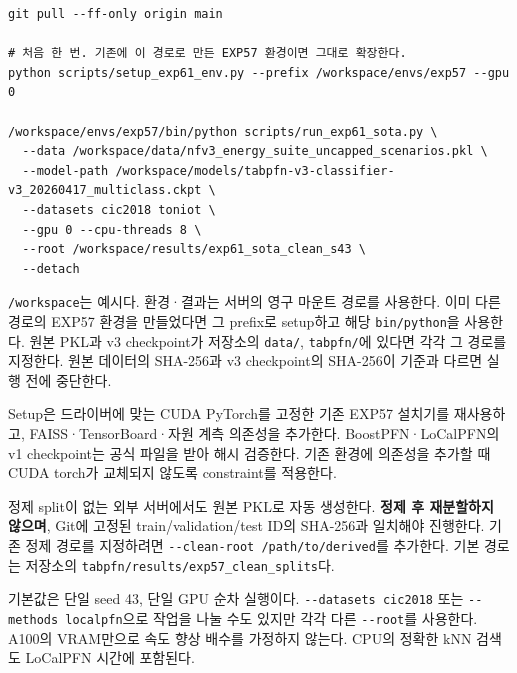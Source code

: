 \begin{Verbatim}[breaklines=true,breakanywhere=true,fontsize=\scriptsize]
git pull --ff-only origin main

# 처음 한 번. 기존에 이 경로로 만든 EXP57 환경이면 그대로 확장한다.
python scripts/setup_exp61_env.py --prefix /workspace/envs/exp57 --gpu 0

/workspace/envs/exp57/bin/python scripts/run_exp61_sota.py \
  --data /workspace/data/nfv3_energy_suite_uncapped_scenarios.pkl \
  --model-path /workspace/models/tabpfn-v3-classifier-v3_20260417_multiclass.ckpt \
  --datasets cic2018 toniot \
  --gpu 0 --cpu-threads 8 \
  --root /workspace/results/exp61_sota_clean_s43 \
  --detach

\end{Verbatim}
\texttt{/\allowbreak{}\allowbreak{}workspa\allowbreak{}ce}는 예시다. 환경·결과는 서버의 영구 마운트 경로를 사용한다. 이미 다른 경로의 EXP57 환경을 만들었다면 그 prefix로 setup하고 해당 \texttt{bin/\allowbreak{}\allowbreak{}pyth\allowbreak{}on}을 사용한다. 원본 PKL과 v3 checkpoint가 저장소의 \texttt{data/\allowbreak{}\allowbreak{}}, \texttt{tabpfn/\allowbreak{}\allowbreak{}}에 있다면 각각 그 경로를 지정한다. 원본 데이터의 SHA-256과 v3 checkpoint의 SHA-256이 기준과 다르면 실행 전에 중단한다.

Setup은 드라이버에 맞는 CUDA PyTorch를 고정한 기존 EXP57 설치기를 재사용하고, FAISS·TensorBoard·자원 계측 의존성을 추가한다. BoostPFN·LoCalPFN의 v1 checkpoint는 공식 파일을 받아 해시 검증한다. 기존 환경에 의존성을 추가할 때 CUDA torch가 교체되지 않도록 constraint를 적용한다.

정제 split이 없는 외부 서버에서도 원본 PKL로 자동 생성한다. \textbf{정제 후 재분할하지 않으며}, Git에 고정된 train/\allowbreak{}validation/\allowbreak{}test ID의 SHA-256과 일치해야 진행한다. 기존 정제 경로를 지정하려면 \texttt{-\allowbreak{}-\allowbreak{}clean-\allowbreak{}root /\allowbreak{}\allowbreak{}pa\allowbreak{}th/\allowbreak{}\allowbreak{}to/\allowbreak{}\allowbreak{}de\allowbreak{}rived}를 추가한다. 기본 경로는 저장소의 \texttt{tabpfn/\allowbreak{}\allowbreak{}r\allowbreak{}esults/\allowbreak{}\allowbreak{}e\allowbreak{}xp57\_\allowbreak{}\allowbreak{}cle\allowbreak{}an\_\allowbreak{}\allowbreak{}split\allowbreak{}s}다.

기본값은 단일 seed 43, 단일 GPU 순차 실행이다. \texttt{-\allowbreak{}-\allowbreak{}datase\allowbreak{}ts cic20\allowbreak{}18} 또는 \texttt{-\allowbreak{}-\allowbreak{}method\allowbreak{}s localp\allowbreak{}fn}으로 작업을 나눌 수도 있지만 각각 다른 \texttt{-\allowbreak{}-\allowbreak{}root}를 사용한다. A100의 VRAM만으로 속도 향상 배수를 가정하지 않는다. CPU의 정확한 kNN 검색도 LoCalPFN 시간에 포함된다.


